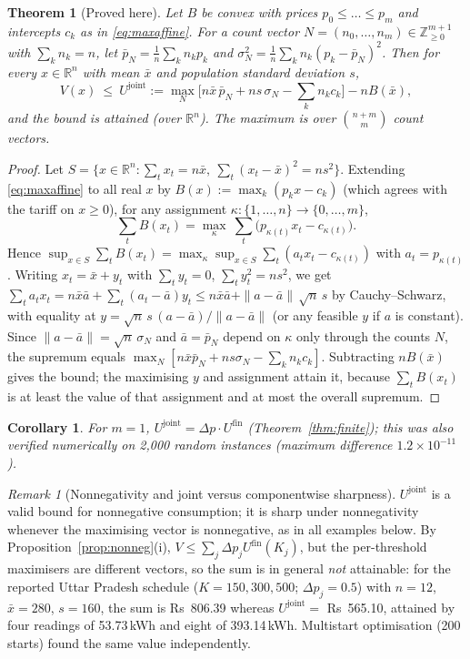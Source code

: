 \documentclass[11pt,a4paper]{article}
\newtheorem{theorem}{Theorem}
\theoremstyle{definition}
\theoremstyle{plain}\newtheorem{sprop}{Proposition}[section]\newtheorem{slemma}[sprop]{Lemma}\newtheorem{scor}[sprop]{Corollary}
\theoremstyle{definition}
\theoremstyle{remark}
\newtheorem{remark}{Remark}
\newcommand{\xbar}{\bar{x}}
\numberwithin{equation}{section}
\begin{document}
\begin{theorem}[Proved here]\label{thm:joint}
Let $B$ be convex with prices $p_0\le\dots\le p_m$ and intercepts $c_k$ as in \eqref{eq:maxaffine}. For a count vector $N=(n_0,\dots,n_m)\in\mathbb Z_{\ge0}^{m+1}$ with $\sum_kn_k=n$, let $\bar p_N=\frac1n\sum_kn_kp_k$ and $\sigma_N^2=\frac1n\sum_kn_k(p_k-\bar p_N)^2$. Then for every $x\in\mathbb R^n$ with mean $\xbar$ and population standard deviation $s$,
\[
V(x)\ \le\ U^{\mathrm{joint}}:=\max_{N}\Big[n\xbar\,\bar p_N+ns\,\sigma_N-\sum_kn_kc_k\Big]-nB(\xbar),
\]
and the bound is attained (over $\mathbb R^n$). The maximum is over $\binom{n+m}{m}$ count vectors.
\end{theorem}
\begin{proof}
Let $S=\{x\in\mathbb R^n:\sum_tx_t=n\xbar,\ \sum_t(x_t-\xbar)^2=ns^2\}$. Extending \eqref{eq:maxaffine} to all real $x$ by $B(x):=\max_k(p_kx-c_k)$ (which agrees with the tariff on $x\ge0$), for any assignment $\kappa:\{1,\dots,n\}\to\{0,\dots,m\}$,
\[
\sum_tB(x_t)=\max_{\kappa}\ \sum_t\big(p_{\kappa(t)}x_t-c_{\kappa(t)}\big).
\]
Hence $\sup_{x\in S}\sum_tB(x_t)=\max_\kappa\sup_{x\in S}\sum_t(a_tx_t-c_{\kappa(t)})$ with $a_t=p_{\kappa(t)}$. Writing $x_t=\xbar+y_t$ with $\sum_ty_t=0$, $\sum_ty_t^2=ns^2$, we get $\sum_ta_tx_t=n\xbar\bar a+\sum_t(a_t-\bar a)y_t\le n\xbar\bar a+\|a-\bar a\|\,\sqrt n\,s$ by Cauchy--Schwarz, with equality at $y=\sqrt n\,s\,(a-\bar a)/\|a-\bar a\|$ (or any feasible $y$ if $a$ is constant). Since $\|a-\bar a\|=\sqrt n\,\sigma_N$ and $\bar a=\bar p_N$ depend on $\kappa$ only through the counts $N$, the supremum equals $\max_N[n\xbar\bar p_N+ns\sigma_N-\sum_kn_kc_k]$. Subtracting $nB(\xbar)$ gives the bound; the maximising $y$ and assignment attain it, because $\sum_tB(x_t)$ is at least the value of that assignment and at most the overall supremum.
\end{proof}

\begin{scor}
For $m=1$, $U^{\mathrm{joint}}=\Delta p\cdot U^{\mathrm{fin}}$ (Theorem~\ref{thm:finite}); this was also verified numerically on 2{,}000 random instances (maximum difference $1.2\times10^{-11}$).
\end{scor}

\begin{remark}[Nonnegativity and joint versus componentwise sharpness]
$U^{\mathrm{joint}}$ is a valid bound for nonnegative consumption; it is sharp under nonnegativity whenever the maximising vector is nonnegative, as in all examples below. By Proposition~\ref{prop:nonneg}(i), $V\le\sum_j\Delta p_j U^{\mathrm{fin}}(K_j)$, but the per-threshold maximisers are different vectors, so the sum is in general \emph{not} attainable: for the reported Uttar Pradesh schedule ($K=150,300,500$; $\Delta p_j=0.5$) with $n=12$, $\xbar=280$, $s=160$, the sum is Rs~806.39 whereas $U^{\mathrm{joint}}=$ Rs~565.10, attained by four readings of 53.73\,kWh and eight of 393.14\,kWh. Multistart optimisation (200 starts) found the same value independently.
\end{remark}
\end{document}
